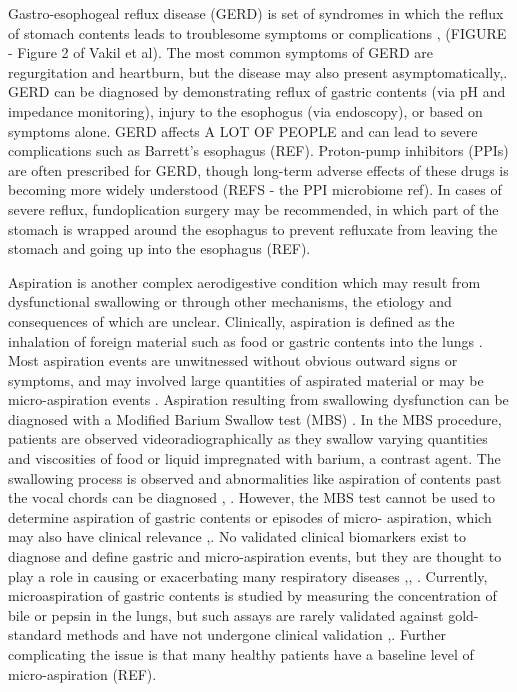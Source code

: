 \documentclass[12pt]{article}
\begin{document}
Gastro-esophogeal reflux disease (GERD) is set of syndromes in which 
the reflux of stomach contents leads to troublesome symptoms or 
complications \cite{vakil-gerd_defn-2006},\cite{dent-gerd_epi-2005}
(FIGURE - Figure 2 of Vakil et al). The most common symptoms of GERD 
are regurgitation and heartburn, but the disease may also present 
asymptomatically\cite{vakil-gerd_defn-2006},\cite{dent-gerd_epi-2005}. 
GERD can be diagnosed by demonstrating reflux of gastric contents (via 
pH and impedance monitoring), injury to the esophogus (via endoscopy), 
or based on symptoms alone\cite{vakil-gerd_defn-2006}. GERD affects
A LOT OF PEOPLE and can lead to severe complications such as Barrett's 
esophagus (REF). Proton-pump inhibitors (PPIs) are often prescribed for GERD,
though long-term adverse effects of these drugs is becoming more widely understood (REFS - the PPI microbiome ref).
In cases of severe reflux, fundoplication surgery may
be recommended, in which part of the stomach is wrapped around the 
esophagus to prevent refluxate from leaving the stomach and going up
into the esophagus (REF). 

Aspiration is another complex aerodigestive condition which may result
from dysfunctional swallowing or through other mechanisms, the etiology and consequences of which are unclear.
Clinically, aspiration is defined as the inhalation of foreign material such as food or 
gastric contents into the lungs \cite{raghavendran-asp_injury-2011}. 
Most aspiration events are unwitnessed without obvious outward signs 
or symptoms, and may involved large quantities of aspirated material 
or may be micro-aspiration events \cite{raghavendran-asp_injury-2011}. 
Aspiration resulting from swallowing dysfunction can be diagnosed with 
a Modified Barium Swallow test (MBS) \cite{martinharris-mbs-2008}. In 
the MBS procedure, patients are observed videoradiographically as they 
swallow varying quantities and viscosities of food or liquid 
impregnated with barium, a contrast agent. The swallowing process is 
observed and abnormalities like aspiration of contents past the vocal 
chords can be diagnosed \cite{martinharris-clinical_mbs-2000},
\cite{martinharris-mbs-2008}. However, the MBS test cannot be used to 
determine aspiration of gastric contents or episodes of micro-
aspiration, which may also have clinical relevance 
\cite{raghavendran-asp_injury-2011},\cite{lee-pulm_asp-2014}. No validated clinical 
biomarkers exist to diagnose and define gastric and micro-aspiration 
events\cite{lee-pulm_asp-2014}, but they are thought to play a role in 
causing or exacerbating many respiratory diseases 
\cite{reen-aspirated_bile-2014},\cite{almomani-cf_sputum-2016},
\cite{houghton-microaspiration-2016}. Currently, microaspiration of gastric contents 
is studied by measuring the concentration of bile or pepsin in the 
lungs, but such assays are rarely validated against gold-standard 
methods and have not undergone clinical validation 
\cite{houghton-microaspiration-2016},\cite{lee-pulm_asp-2014}. Further complicating 
the issue is that many healthy patients have a baseline level of 
micro-aspiration (REF).
\end{document}
